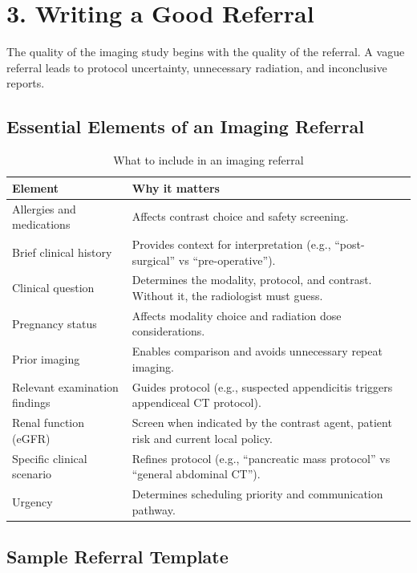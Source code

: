 \section*{3. Writing a Good Referral}
The quality of the imaging study begins with the quality of the referral. A vague referral leads to protocol uncertainty, unnecessary radiation, and inconclusive reports.

\subsection*{Essential Elements of an Imaging Referral}

\begin{table}[h]
\centering
\caption{What to include in an imaging referral}
\begin{tabular}{|l|p{8cm}|}
\hline
\textbf{Element} & \textbf{Why it matters} \\
\hline
Allergies and medications & Affects contrast choice and safety screening. \\
\hline
Brief clinical history & Provides context for interpretation (e.g., ``post-surgical'' vs ``pre-operative''). \\
\hline
Clinical question & Determines the modality, protocol, and contrast. Without it, the radiologist must guess. \\
\hline
Pregnancy status & Affects modality choice and radiation dose considerations. \\
\hline
Prior imaging & Enables comparison and avoids unnecessary repeat imaging. \\
\hline
Relevant examination findings & Guides protocol (e.g., suspected appendicitis triggers appendiceal CT protocol). \\
\hline
Renal function (eGFR) & Screen when indicated by the contrast agent, patient risk and current local policy. \\
\hline
Specific clinical scenario & Refines protocol (e.g., ``pancreatic mass protocol'' vs ``general abdominal CT''). \\
\hline
Urgency & Determines scheduling priority and communication pathway. \\
\hline
\end{tabular}
\end{table}

\subsection*{Sample Referral Template}

